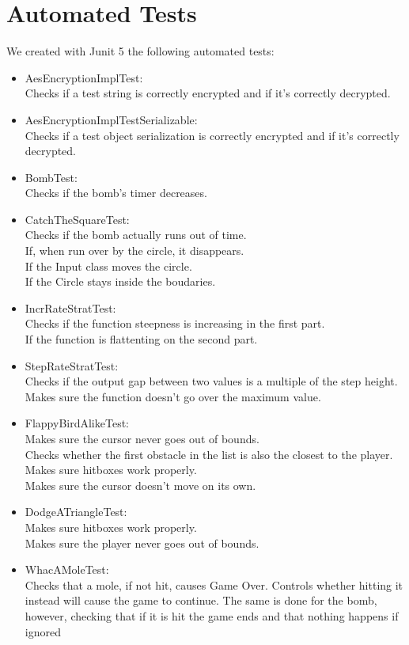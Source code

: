 \documentclass[a4paper,12pt]{report}
\begin{document}
\section{Automated Tests}
We created with Junit 5 the following automated tests:
\begin{itemize}
	\item AesEncryptionImplTest:\\
	      Checks if a test string is correctly encrypted and if it's correctly decrypted.
	\item AesEncryptionImplTestSerializable:\\
	      Checks if a test object serialization is correctly encrypted and if it's correctly decrypted.
	\item BombTest:\\
	      Checks if the bomb's timer decreases.
	\item CatchTheSquareTest:\\
	      Checks if the bomb actually runs out of time.\\If, when run over by the circle, it disappears.\\ If the Input class moves the circle. \\ If the Circle stays inside the boudaries.
	\item IncrRateStratTest:\\
	      Checks if the function steepness is increasing in the first part.\\ If the function is flattenting on the second part.
	\item StepRateStratTest:\\
	      Checks if the output gap between two values is a multiple of the step height.\\ Makes sure the function doesn't go over the maximum value.
	\item FlappyBirdAlikeTest:\\
	      Makes sure the cursor never goes out of bounds.\\ Checks whether the first obstacle in the list is also the closest to the player.\\ Makes sure hitboxes work properly.\\ Makes sure the cursor doesn't move on its own.
	\item DodgeATriangleTest:\\
	      Makes sure hitboxes work properly.\\ Makes sure the player never goes out of bounds.
	\item WhacAMoleTest: \\
	      Checks that a mole, if not hit, causes Game Over. Controls whether hitting it instead will cause the game to continue. The same is done for the bomb, however, checking that if it is hit the game ends and that nothing happens if ignored

\end{itemize}
\end{document}
